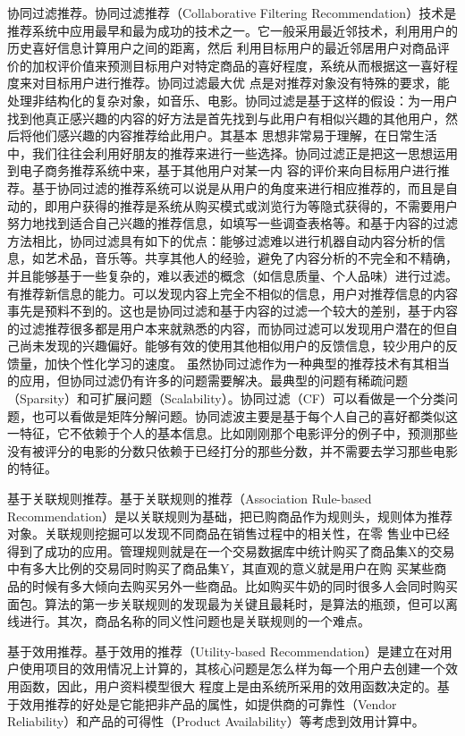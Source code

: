     协同过滤推荐。协同过滤推荐（Collaborative Filtering Recommendation）技术是推荐系统中应用最早和最为成功的技术之一。它一般采用最近邻技术，利用用户的历史喜好信息计算用户之间的距离，然后 利用目标用户的最近邻居用户对商品评价的加权评价值来预测目标用户对特定商品的喜好程度，系统从而根据这一喜好程度来对目标用户进行推荐。协同过滤最大优 点是对推荐对象没有特殊的要求，能处理非结构化的复杂对象，如音乐、电影。协同过滤是基于这样的假设：为一用户找到他真正感兴趣的内容的好方法是首先找到与此用户有相似兴趣的其他用户，然后将他们感兴趣的内容推荐给此用户。其基本 思想非常易于理解，在日常生活中，我们往往会利用好朋友的推荐来进行一些选择。协同过滤正是把这一思想运用到电子商务推荐系统中来，基于其他用户对某一内 容的评价来向目标用户进行推荐。基于协同过滤的推荐系统可以说是从用户的角度来进行相应推荐的，而且是自动的，即用户获得的推荐是系统从购买模式或浏览行为等隐式获得的，不需要用户努力地找到适合自己兴趣的推荐信息，如填写一些调查表格等。和基于内容的过滤方法相比，协同过滤具有如下的优点：能够过滤难以进行机器自动内容分析的信息，如艺术品，音乐等。共享其他人的经验，避免了内容分析的不完全和不精确，并且能够基于一些复杂的，难以表述的概念（如信息质量、个人品味）进行过滤。有推荐新信息的能力。可以发现内容上完全不相似的信息，用户对推荐信息的内容事先是预料不到的。这也是协同过滤和基于内容的过滤一个较大的差别，基于内容的过滤推荐很多都是用户本来就熟悉的内容，而协同过滤可以发现用户潜在的但自己尚未发现的兴趣偏好。能够有效的使用其他相似用户的反馈信息，较少用户的反馈量，加快个性化学习的速度。 虽然协同过滤作为一种典型的推荐技术有其相当的应用，但协同过滤仍有许多的问题需要解决。最典型的问题有稀疏问题（Sparsity）和可扩展问题（Scalability）。协同过滤（CF）可以看做是一个分类问题，也可以看做是矩阵分解问题。协同滤波主要是基于每个人自己的喜好都类似这一特征，它不依赖于个人的基本信息。比如刚刚那个电影评分的例子中，预测那些没有被评分的电影的分数只依赖于已经打分的那些分数，并不需要去学习那些电影的特征。

    基于关联规则推荐。基于关联规则的推荐（Association Rule-based Recommendation）是以关联规则为基础，把已购商品作为规则头，规则体为推荐对象。关联规则挖掘可以发现不同商品在销售过程中的相关性，在零 售业中已经得到了成功的应用。管理规则就是在一个交易数据库中统计购买了商品集X的交易中有多大比例的交易同时购买了商品集Y，其直观的意义就是用户在购 买某些商品的时候有多大倾向去购买另外一些商品。比如购买牛奶的同时很多人会同时购买面包。算法的第一步关联规则的发现最为关键且最耗时，是算法的瓶颈，但可以离线进行。其次，商品名称的同义性问题也是关联规则的一个难点。

    基于效用推荐。基于效用的推荐（Utility-based Recommendation）是建立在对用户使用项目的效用情况上计算的，其核心问题是怎么样为每一个用户去创建一个效用函数，因此，用户资料模型很大 程度上是由系统所采用的效用函数决定的。基于效用推荐的好处是它能把非产品的属性，如提供商的可靠性（Vendor Reliability）和产品的可得性（Product Availability）等考虑到效用计算中。

